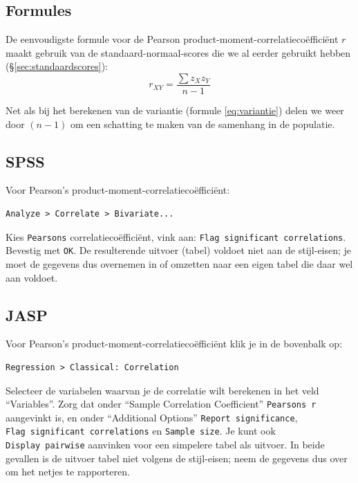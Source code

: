 \documentclass[
]{book}
\begin{document}
\hypertarget{formules-3}{%
\subsection{Formules}\label{formules-3}}

De eenvoudigste formule voor de Pearson
product-moment-correlatiecoëfficiënt \(r\) maakt gebruik van de
standaard-normaal-scores die we al eerder gebruikt hebben
(§\ref{sec:standaardscores}):
\begin{equation}
    r_{XY} = \frac{\sum z_X z_Y}{n-1}
  \label{eq:pearson}
\end{equation}

Net als bij het berekenen van de variantie
(formule \eqref{eq:variantie}) delen we weer door \((n-1)\) om een schatting
te maken van de samenhang in de populatie.

\hypertarget{spss-5}{%
\subsection{SPSS}\label{spss-5}}

Voor Pearson's product-moment-correlatiecoëfficiënt:

\begin{verbatim}
Analyze > Correlate > Bivariate...
\end{verbatim}

Kies \texttt{Pearsons} correlatiecoëfficiënt, vink aan:
\texttt{Flag\ significant\ correlations}. Bevestig met \texttt{OK}. De resulterende
uitvoer (tabel) voldoet niet aan de stijl-eisen; je moet de gegevens dus
overnemen in of omzetten naar een eigen tabel die daar wel aan voldoet.

\hypertarget{jasp-7}{%
\subsection{JASP}\label{jasp-7}}

Voor Pearson's product-moment-correlatiecoëfficiënt klik je in de bovenbalk op:

\begin{verbatim}
Regression > Classical: Correlation
\end{verbatim}

Selecteer de variabelen waarvan je de correlatie wilt berekenen in het veld ``Variables''. Zorg dat onder ``Sample Correlation Coefficient'' \texttt{Pearson\textquotesingle{}s\ r} aangevinkt is, en onder ``Additional Options'' \texttt{Report\ significance}, \texttt{Flag\ significant\ correlations} en \texttt{Sample\ size}. Je kunt ook \texttt{Display\ pairwise} aanvinken voor een simpelere tabel als uitvoer. In beide gevallen is de uitvoer tabel niet volgens de stijl-eisen; neem de gegevens dus over om het netjes te rapporteren.
\end{document}
